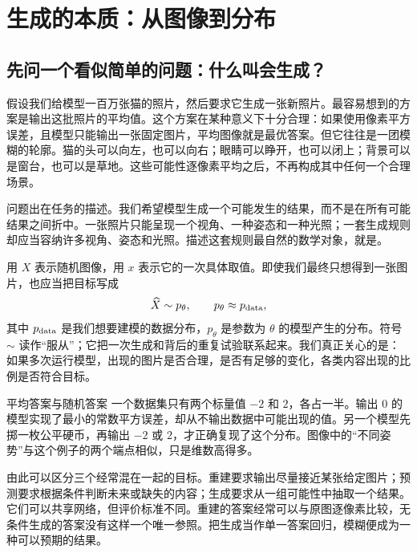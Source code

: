 \chapter{生成的本质：从图像到分布}
\label{ch:concepts}


\section{先问一个看似简单的问题：什么叫会生成？}
\label{sec:c-generation}

假设我们给模型一百万张猫的照片，然后要求它生成一张新照片。最容易想到的方案是输出这批照片的平均值。这个方案在某种意义下十分合理：如果使用像素平方误差，且模型只能输出一张固定图片，平均图像就是最优答案。但它往往是一团模糊的轮廓。猫的头可以向左，也可以向右；眼睛可以睁开，也可以闭上；背景可以是窗台，也可以是草地。这些可能性逐像素平均之后，不再构成其中任何一个合理场景。

问题出在任务的描述。我们希望模型生成一个可能发生的结果，而不是在所有可能结果之间折中。一张照片只能呈现一个视角、一种姿态和一种光照；一套生成规则却应当容纳许多视角、姿态和光照。描述这套规则最自然的数学对象，就是。

用 $X$ 表示随机图像，用 $x$ 表示它的一次具体取值。即使我们最终只想得到一张图片，也应当把目标写成
\[
  \widehat X\sim p_\theta,\qquad p_\theta\approx p_{\mathrm{data}},
\]
其中 $p_{\mathrm{data}}$ 是我们想要建模的数据分布，$p_\theta$ 是参数为 $\theta$ 的模型产生的分布。符号 $\sim$ 读作“服从”；它把一次生成和背后的重复试验联系起来。我们真正关心的是：如果多次运行模型，出现的图片是否合理，是否有足够的变化，各类内容出现的比例是否符合目标。

\begin{examplebox}[unbreakable]{平均答案与随机答案}
一个数据集只有两个标量值 $-2$ 和 $2$，各占一半。输出 $0$ 的模型实现了最小的常数平方误差，却从不输出数据中可能出现的值。另一个模型先掷一枚公平硬币，再输出 $-2$ 或 $2$，才正确复现了这个分布。图像中的“不同姿势”与这个例子的两个端点相似，只是维数高得多。
\end{examplebox}

由此可以区分三个经常混在一起的目标。重建要求输出尽量接近某张给定图片；预测要求根据条件判断未来或缺失的内容；生成要求从一组可能性中抽取一个结果。它们可以共享网络，但评价标准不同。重建的答案经常可以与原图逐像素比较，无条件生成的答案没有这样一个唯一参照。把生成当作单一答案回归，模糊便成为一种可以预期的结果。

